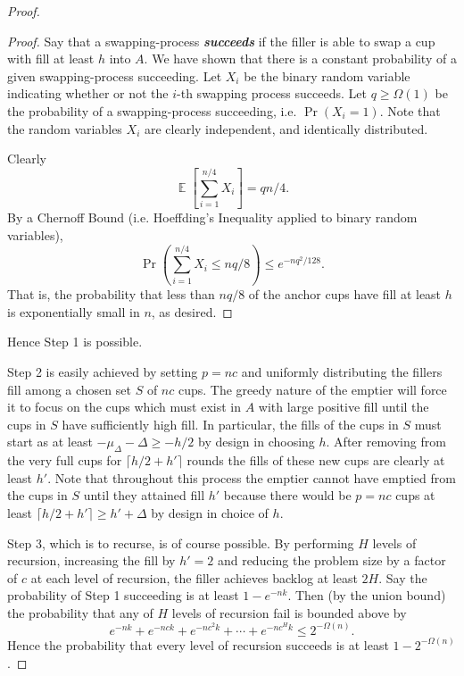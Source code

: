 \documentclass[twocolumn]{article}[10pt]
\newcommand{\defn}[1]{{\textit{\textbf{\boldmath #1}}}\xspace}
\DeclareMathOperator{\E}{\mathbb{E}}
\begin{document}
\begin{proof}
\begin{proof}
  Say that a swapping-process \defn{succeeds} if the filler is able to swap a
  cup with fill at least $h$ into $A$. We have shown that there is a constant
  probability of a given swapping-process succeeding. Let $X_i$ be the binary
  random variable indicating whether or not the $i$-th swapping process
  succeeds. Let $q \ge \Omega(1)$ be the probability of a swapping-process
  succeeding, i.e. $\Pr(X_i=1)$. Note that the random variables $X_i$ are clearly
  independent, and identically distributed.

  Clearly $$\E\left[\sum_{i=1}^{n/4} X_i\right] = qn/4.$$ 
  By a Chernoff Bound (i.e. Hoeffding's Inequality applied to binary random variables),
  $$\Pr\left(\sum_{i=1}^{n/4} X_i\le nq/8\right) \le e^{-nq^2/128}.$$ That is, the
  probability that less than $nq/8$ of the anchor cups have fill at least $h$ is
  exponentially small in $n$, as desired.

\end{proof}

Hence Step 1 is possible.

Step 2 is easily achieved by setting $p=nc$ and uniformly distributing the
fillers fill among a chosen set $S$ of $nc$ cups. The greedy nature of the
emptier will force it to focus on the cups which must exist in $A$ with large
positive fill until the cups in $S$ have sufficiently high fill. In particular,
the fills of the cups in $S$ must start as at least $-\mu_\Delta - \Delta \ge
-h/2$ by design in choosing $h$. After removing from the very full cups for
$\lceil h/2+h' \rceil$ rounds the fills of these new cups are clearly at least
$h'$. Note that throughout this process the emptier cannot have emptied from
the cups in $S$ until they attained fill $h'$ because there would be $p=nc$
cups at least $\lceil h/2+h' \rceil \ge h' + \Delta$ by design in choice of $h$.

Step 3, which is to recurse, is of course possible. 
By performing $H$ levels of recursion, increasing the fill by $h' = 2$ and
reducing the problem size by a factor of $c$ at each
level of recursion, the filler achieves backlog at least $2H$. 
Say the probability of Step 1 succeeding is at least
$1-e^{-nk}$. Then (by the union bound) the probability that any of $H$ levels of
recursion fail is bounded above by 
$$e^{-nk} + e^{-nck} + e^{-nc^2 k} + \cdots + e^{-nc^H k} \le 2^{-\Omega(n)}.$$
Hence the probability that every level of recursion succeeds is at least $1-2^{-\Omega(n)}$.

\end{proof}
\end{document}
